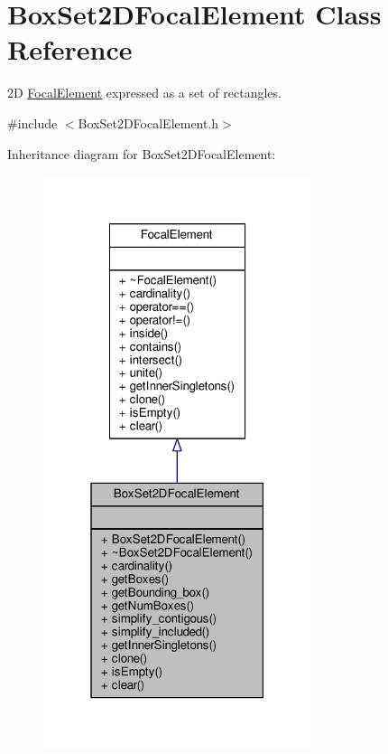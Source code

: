 \hypertarget{classBoxSet2DFocalElement}{}\section{Box\+Set2\+D\+Focal\+Element Class Reference}
\label{classBoxSet2DFocalElement}


2D \hyperlink{classFocalElement}{Focal\+Element} expressed as a set of rectangles.  




{\ttfamily \#include $<$Box\+Set2\+D\+Focal\+Element.\+h$>$}



Inheritance diagram for Box\+Set2\+D\+Focal\+Element\+:\nopagebreak
\begin{figure}[H]
\begin{center}
\leavevmode
\includegraphics[width=223pt]{classBoxSet2DFocalElement__inherit__graph}
\end{center}
\end{figure}


